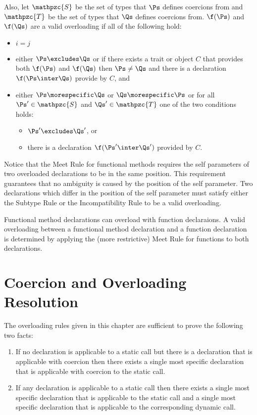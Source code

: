 Also, let $\mathpzc{S}$ be the set of types that $\Ps$
defines coercions from and $\mathpzc{T}$ be the set of types that
$\Qs$ defines coercions from.  $\f(\Ps)$ and $\f(\Qs)$ are a valid
overloading if all of the following hold:
\begin{itemize}
\item
$i = j$
\item
either $\Ps \excludes \Qs$ or if there exists a trait or object $C$
that provides both $\f(\Ps)$ and $\f(\Qs)$ then $\Ps \neq \Qs$ and
there is a declaration $\f(\Ps \inter \Qs)$ provide by $C$, and
\item
either $\Ps \morespecific \Qs$ or $\Qs \morespecific \Ps$ or
for all $\Ps' \in \mathpzc{S}$ and
$\Qs' \in \mathpzc{T}$ one of the two conditions holds:
\begin{itemize}
\item
$\Ps' \excludes \Qs'$, or
\item
there is a declaration $\f(\Ps' \inter \Qs')$ provided by $C$.
\end{itemize}
\end{itemize}

Notice that the Meet Rule for functional methods requires the self
parameters of two overloaded declarations to be in the same position.
This requirement guarantees that no ambiguity is caused by the
position of the self parameter.  Two declarations which differ in the
position of the self parameter must satisfy either the Subtype Rule or
the Incompatibility Rule to be a valid overloading.

Functional method declarations can overload with function declaraions.
A valid overloading between a functional method declaration and
a function declaration is
determined by applying the (more restrictive) Meet Rule for functions
to both declarations.

\section{Coercion and Overloading Resolution}

The overloading rules given in this chapter are
sufficient to prove the following two facts:
\begin{enumerate}
\item
If no declaration is applicable to a static call but there is a
declaration that is applicable with coercion then there exists a
single most specific declaration that is applicable with coercion to
the static call.
\item
If any declaration is applicable to a static call then there exists a
single most specific declaration that is applicable to the static call
and a single most specific declaration that is applicable to the
corresponding dynamic call.
\end{enumerate}

